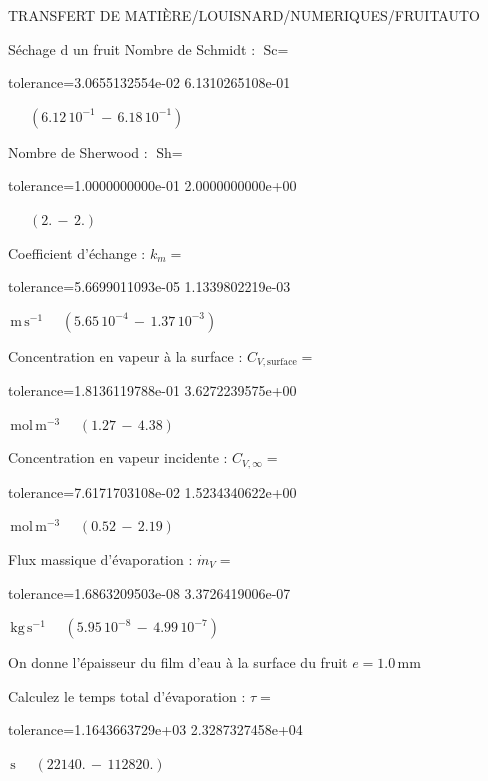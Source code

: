 \documentclass[12pt]{article}
\begin{document}
\begin{quiz}{TRANSFERT DE MATIÈRE/LOUISNARD/NUMERIQUES/FRUITAUTO}
\begin{cloze}{Séchage d un fruit}
Nombre de Schmidt : $\text{Sc} =  $
\begin{numerical}[points=1] 
\item[tolerance={3.0655132554e-02}] 6.1310265108e-01 
\end{numerical} 
 $\,$ 
 $ \quad ( 6.12 \, 10^{-1}  \, - \,  6.18 \, 10^{-1} ) $ 

Nombre de Sherwood : $\text{Sh} =  $
\begin{numerical}[points=2] 
\item[tolerance={1.0000000000e-01}] 2.0000000000e+00 
\end{numerical} 
 $\,$ 
 $ \quad (2. \, - \, 2.) $ 

Coefficient d'échange : $k_m =  $
\begin{numerical}[points=1] 
\item[tolerance={5.6699011093e-05}] 1.1339802219e-03 
\end{numerical} 
 $\,  \mathrm{m}\,  \mathrm{s}^{-1}$ 
 $ \quad ( 5.65 \, 10^{-4}  \, - \,  1.37 \, 10^{-3} ) $ 

Concentration en vapeur à la surface : $C_{V, \text{surface}} =  $
\begin{numerical}[points=2] 
\item[tolerance={1.8136119788e-01}] 3.6272239575e+00 
\end{numerical} 
 $\,  \mathrm{mol}\,  \mathrm{m}^{-3}$ 
 $ \quad (1.27 \, - \, 4.38) $ 

Concentration en vapeur incidente : $C_{V, \infty} =  $
\begin{numerical}[points=2] 
\item[tolerance={7.6171703108e-02}] 1.5234340622e+00 
\end{numerical} 
 $\,  \mathrm{mol}\,  \mathrm{m}^{-3}$ 
 $ \quad (0.52 \, - \, 2.19) $ 

Flux massique d'évaporation : $\dot{m}_V =  $
\begin{numerical}[points=1] 
\item[tolerance={1.6863209503e-08}] 3.3726419006e-07 
\end{numerical} 
 $\,  \mathrm{kg}\,  \mathrm{s}^{-1}$ 
 $ \quad ( 5.95 \, 10^{-8}  \, - \,  4.99 \, 10^{-7} ) $ 

 

On donne l'épaisseur du film d'eau à la surface du fruit $e = 1.0\,  \mathrm{mm} $

Calculez le temps total d'évaporation : $\tau =  $
\begin{numerical}[points=2] 
\item[tolerance={1.1643663729e+03}] 2.3287327458e+04 
\end{numerical} 
 $\,  \mathrm{s}$ 
 $ \quad (22140. \, - \, 112820.) $ 


\end{cloze}
\end{quiz}
\end{document}
